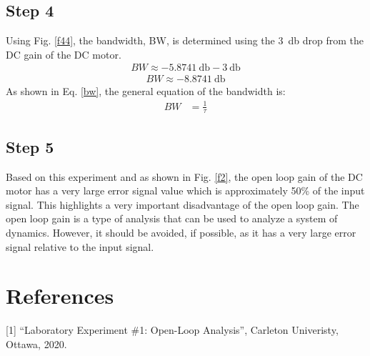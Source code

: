 \documentclass[hidelinks]{article}
\begin{document}
	\pagebreak
	\subsection{Step 4}
	Using Fig. \ref{f44}, the bandwidth, BW, is determined using the \SI{3}{\decibel} drop from the DC gain of the DC motor.
	\begin{align*}
		BW \approx \SI{-5.8741}{\decibel} - \SI{3}{\decibel}\nonumber
	\end{align*} 
	\begin{align*}
		BW \approx \SI{-8.8741}{\decibel}
	\end{align*}
	As shown in Eq. \ref{bw}, the general equation of the bandwidth is:
	\begin{align}
		BW &= \frac{1}{\tau}\nonumber
	\end{align}
	
	
	\subsection{Step 5}
	Based on this experiment and as shown in Fig. \ref{f2}, the open loop gain of the DC motor has a very large error signal value which is approximately 50\% of the input signal.
	This highlights a very important disadvantage of the open loop gain. The open loop gain is a type of analysis that can be used to analyze a system of dynamics. However, it should be avoided, if possible, as it has a very large error signal relative to the input signal.
	\pagebreak
	\section{References}
	[1] “Laboratory Experiment \#1: Open-Loop Analysis”, Carleton Univeristy, Ottawa, 2020.
\end{document}
